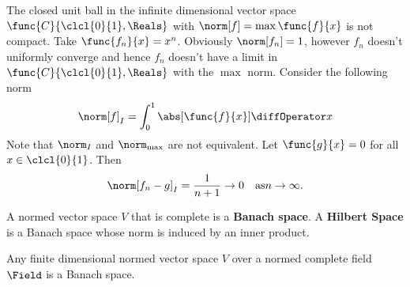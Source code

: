%
%

\begin{example}
    The closed unit ball in the infinite dimensional vector space \(\func{C}{\clcl{0}{1},\Reals}\) with \(\norm[f] = \max \func{f}{x}\) is not compact.  Take \(\func{f_n}{x} = x^n\). Obviously \(\norm[f_n] = 1\), however \(f_n\) doesn't uniformly converge and hence \(f_n\) doesn't have a limit in \(\func{C}{\clcl{0}{1},\Reals}\) with the \(\max\) norm. Consider the following norm
    \begin{equation*}
        \norm[f]_I = \int_0^1 \abs[\func{f}{x}] \diffOperator x
    \end{equation*}
    Note that \(\norm_I\) and \(\norm_{\max} \) are not equivalent. Let \(\func{g}{x} = 0\) for all \(x \in \clcl{0}{1}\). Then
    \begin{equation*}
        \norm[f_n - g]_I = \dfrac{1}{n+1} \to 0 \quad \text{as} n \to \infty.
    \end{equation*}
\end{example}

\begin{definition}
    A normed vector space \(V\) that is complete is a \textbf{Banach space}. A \textbf{Hilbert Space} is a Banach space whose norm is induced by an inner product.
\end{definition}

\begin{corollary}
    Any finite dimensional normed vector space \(V\) over a normed complete field \(\Field\) is a Banach space.
\end{corollary}
%

